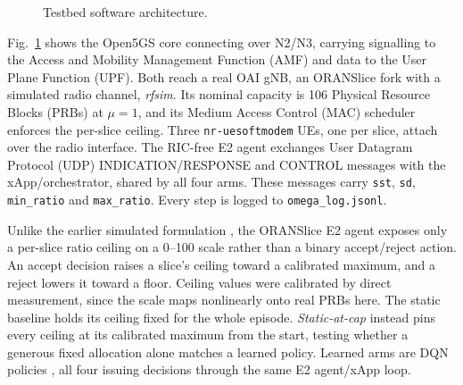 \documentclass[10pt]{article}
\begin{document}
\begin{figure}[t]
\caption{Testbed software architecture.}
\label{fig:architecture}
\end{figure}

Fig.~\ref{fig:architecture} shows the Open5GS core connecting over
N2/N3, carrying signalling to the Access and Mobility Management
Function (AMF) and data to the User Plane Function (UPF). Both reach
a real OAI gNB, an ORANSlice fork \cite{oranslice} with a simulated
radio channel, \textit{rfsim}. Its nominal capacity is 106 Physical Resource
Blocks (PRBs) at $\mu=1$, and its Medium Access Control (MAC)
scheduler enforces the per-slice ceiling. Three
\texttt{nr-uesoftmodem} UEs, one per slice, attach over the radio
interface. The RIC-free E2
agent exchanges User Datagram Protocol (UDP) INDICATION/RESPONSE and
CONTROL messages with the xApp/orchestrator, shared by all four arms.
These messages carry \texttt{sst}, \texttt{sd}, \texttt{min\_ratio}
and \texttt{max\_ratio}. Every step is logged to
\texttt{omega\_log.jsonl}.

Unlike the earlier simulated formulation \cite{mecon-paper1,icraie-paper2},
the ORANSlice E2 agent exposes only a per-slice ratio ceiling on
a 0--100 scale rather than a binary accept/reject action. An accept decision raises a slice's ceiling toward
a calibrated maximum, and a reject lowers it toward a floor. Ceiling
values were calibrated by direct measurement, since the scale maps
nonlinearly onto real PRBs here. The static baseline holds its
ceiling fixed for the whole episode. \emph{Static-at-cap} instead pins every
ceiling at its calibrated maximum from the start, testing whether a
generous fixed allocation alone matches a learned policy. Learned
arms are DQN policies \cite{dqn}, all four issuing decisions through
the same E2 agent/xApp loop.
\end{document}
